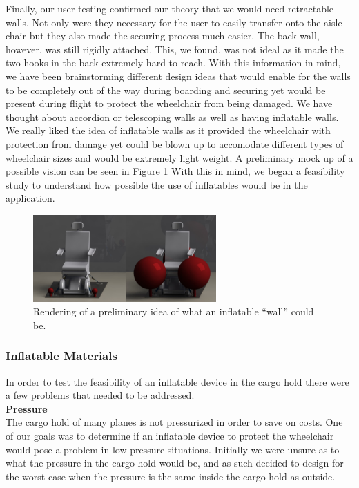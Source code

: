 Finally, our user testing confirmed our theory that we would need retractable walls. Not only were they necessary for the user to easily transfer onto the aisle chair but they also made the securing process much easier. The back wall, however, was still rigidly attached. This, we found, was not ideal as it made the two hooks in the back extremely hard to reach. With this information in mind, we have been brainstorming different design ideas that would enable for the walls to be completely out of the way during boarding and securing yet would be present during flight to protect the wheelchair from being damaged. We have thought about accordion or telescoping walls as well as having inflatable walls. We really liked the idea of inflatable walls as it provided the wheelchair with protection from damage yet could be blown up to accomodate different types of wheelchair sizes and would be extremely light weight. A preliminary mock up of a possible vision can be seen in Figure \ref{fig:inflatablesrendering.png} With this in mind, we began a feasibility study to understand how possible the use of inflatables would be in the application. 


\begin{figure}[h]
  \centering
     \includegraphics[width=7cm]{images/inflatablesrendering.png}
   \caption{Rendering of a preliminary idea of what an inflatable ``wall'' could be.}
  \label{fig:inflatablesrendering.png}
\end{figure}


\subsubsection{Inflatable Materials}

In order to test the feasibility of an inflatable device in the cargo hold there were a few problems that needed to be addressed. 
\\
\noindent\textbf{Pressure}\\
The cargo hold of many planes is not pressurized in order to save on costs. One of our goals was to determine if an inflatable device to protect the wheelchair would pose a problem in low pressure situations. Initially we were unsure as to what the pressure in the cargo hold would be, and as such decided to design for the worst case when the pressure is the same inside the cargo hold as outside. 

